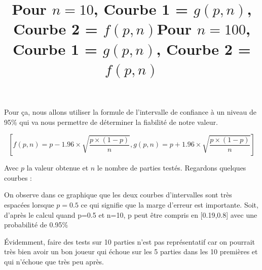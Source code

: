 \documentclass{report}
\begin{document}
Pour ça, nous allons utiliser la formule de l'intervalle de confiance à un niveau de 95\% qui va nous permettre de déterminer la fiabilité de notre valeur.

\begin{equation}
    \left[f(p,n) = p-1.96\times\sqrt{\frac{p\times(1-p)}{n}} ,  g(p,n) = p+1.96\times\sqrt{\frac{p\times(1-p)}{n}} \right]
\end{equation}

Avec $p$ la valeur obtenue et $n$ le nombre de parties testés.
\newline
\newline
Regardons quelques courbes :
\newline


\begin{center}
\begin{center}
    \title{Pour $n=10$, Courbe 1 = $g(p,n)$, Courbe 2 = $f(p,n)$}
\end{center}
\end{center}
On observe dans ce graphique que les deux courbes d'intervalles sont très espacées lorsque $p=0.5$ ce qui signifie que la marge d'erreur est importante. Soit, d'après le calcul quand p=0.5 et n=10, p peut être compris en [0.19,0.8] avec une probabilité de 0.95\% \newline

Évidemment, faire des tests sur 10 parties n'est pas représentatif car on pourrait très bien avoir un bon joueur qui échoue sur les 5 parties dans les 10 premières et qui n'échoue que très peu après.\newline

\begin{center}
\begin{center}
    \title{Pour $n=100$, Courbe 1 = $g(p,n)$, Courbe 2 = $f(p,n)$}
\end{center}
\end{center}
\end{document}
